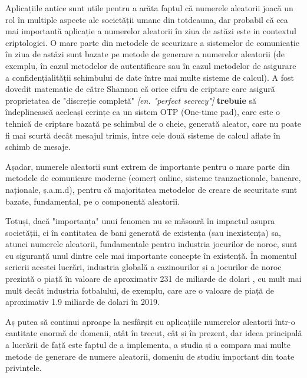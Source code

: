 Aplicațiile antice sunt utile pentru a arăta faptul că numerele aleatorii joacă un rol în multiple aspecte ale societății umane din totdeauna, dar probabil că cea mai importantă aplicație a numerelor aleatorii în ziua de astăzi este in contextul criptologiei. O mare parte din metodele de securizare a sistemelor de comunicație în ziua de astăzi sunt bazate pe metode de generare a numerelor aleatorii (de exemplu, în cazul metodelor de autentificare sau în cazul metodelor de asigurare a confidențialității schimbului de date între mai multe sisteme de calcul). A fost dovedit matematic de către Shannon \cite{art:shannon:secrecy:1949} că orice cifru de criptare care asigură proprietatea de "discreție completă" \textit{[en. "perfect secrecy"]} \textbf{trebuie} să îndeplinească aceleași cerințe ca un sistem OTP (One-time pad), care este o tehnică de criptare bazată pe schimbul de o cheie, generată aleator, care nu poate fi mai scurtă decât mesajul trimis, între cele două sisteme de calcul aflate în schimb de mesaje.

Așadar, numerele aleatorii sunt extrem de importante pentru o mare parte din metodele de comunicare moderne (comerț online, sisteme tranzacționale, bancare, naționale, ș.a.m.d), pentru că majoritatea metodelor de creare de securitate sunt bazate, fundamental, pe o componentă aleatorii.

Totuși, dacă "importanța" unui fenomen nu se măsoară în impactul asupra societății, ci în cantitatea de bani generată de existența (sau inexistența) sa, atunci numerele aleatorii, fundamentale pentru industria jocurilor de noroc, sunt cu siguranță unul dintre cele mai importante concepte în existență. În momentul scrierii acestei lucrări, industria globală a cazinourilor și a jocurilor de noroc prezintă o piață în valoare de aproximativ 231 de miliarde de dolari \cite{misc:web:statista:gambling}, cu mult mai mult decât industria fotbalului, de exemplu, care are o valoare de piață de aproximativ 1.9 miliarde de dolari în 2019.

Aș putea să continui aproape la nesfârșit cu aplicațiile numerelor aleatorii într-o cantitate enormă de domenii, atât în trecut, cât și în prezent, dar ideea principală a lucrării de față este faptul de a implementa, a studia și a compara mai multe metode de generare de numere aleatorii, domeniu de studiu important din toate privințele.

\pagebreak

